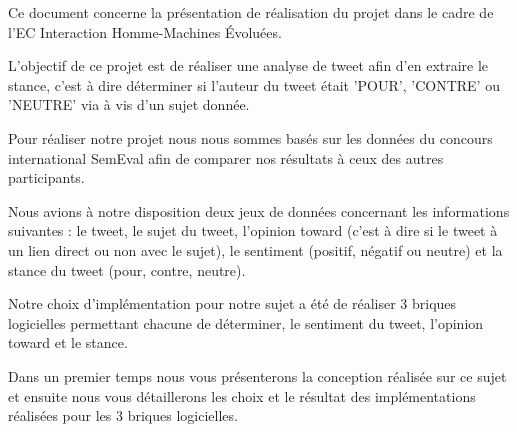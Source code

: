 	\par Ce document concerne la présentation de réalisation du projet dans le cadre de l'EC Interaction Homme-Machines Évoluées.  
	\par L'objectif de ce projet est de réaliser une analyse de tweet afin d'en extraire le stance, c'est à dire déterminer si l'auteur du tweet était 'POUR', 'CONTRE' ou 'NEUTRE' via à vis d'un sujet donnée.\\ 
	
  \par Pour réaliser notre projet nous nous sommes basés sur les données du concours international SemEval afin de comparer nos résultats à ceux des autres participants. 

	\par Nous avions à notre disposition deux jeux de données concernant les informations suivantes : le tweet, le sujet du tweet, l'opinion toward (c'est à dire si le tweet à un lien direct ou non avec le sujet), le sentiment (positif, négatif ou neutre) et la stance du tweet (pour, contre, neutre). 
	
	\par Notre choix d'implémentation pour notre sujet a été de réaliser 3 briques logicielles permettant chacune de déterminer, le sentiment du tweet, l'opinion toward et le stance. \\
	
	\par Dans un premier temps nous vous présenterons la conception réalisée sur ce sujet et ensuite nous vous détaillerons les choix et le résultat des implémentations réalisées pour les 3 briques logicielles.
